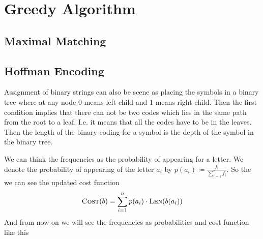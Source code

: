 \chapter{Greedy Algorithm}

\section{Maximal Matching}

\section{Hoffman Encoding}
\begin{algoprob}
\end{algoprob}

Assignment of binary strings can also be scene as placing the symbols in a binary tree where at any node $0$ means left child and $1$ means right child. Then the first condition implies that there can not be two codes which lies in the same path from the root to a leaf. I.e. it means that all the codes have to be in the leaves. Then the length of the binary coding for a symbol  is the depth of the symbol in the binary tree. 

We can think the frequencies as the probability of appearing for a letter. We denote the probability of appearing of the letter $a_i$ by $p(a_i)\coloneqq \frac{f_i}{\sum\limits_{i=1}^nf_i}$. So the we can see the updated cost function $$\textsc{Cost}(b)=\sum\limits_{i=1}^n p(a_i)\cdot\textsc{Len}(b(a_i))$$And from now on we will see the frequencies as probabilities and cost function like this


